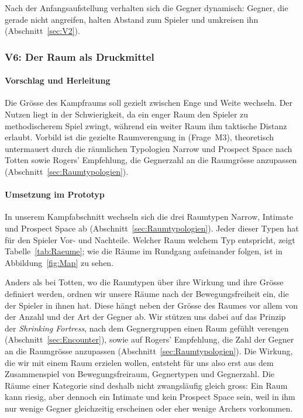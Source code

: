 \documentclass[../Main.tex]{subfiles}
\begin{document}
Nach der Anfangsaufstellung verhalten sich die Gegner dynamisch: Gegner, die gerade nicht angreifen, halten Abstand zum Spieler und umkreisen ihn (Abschnitt~\ref{sec:V2}).

\subsubsection{V6: Der Raum als Druckmittel} \label{sec:V6}

\paragraph{Vorschlag und Herleitung}
Die Grösse des Kampfraums soll gezielt zwischen Enge und Weite wechseln. Der Nutzen liegt in der Schwierigkeit, da ein enger Raum den Spieler zu methodischerem Spiel zwingt, während ein weiter Raum ihm taktische Distanz erlaubt. Vorbild ist die gezielte Raumverengung in  (Frage~M3), theoretisch untermauert durch die räumlichen Typologien Narrow und Prospect Space nach Totten sowie Rogers' Empfehlung, die Gegnerzahl an die Raumgrösse anzupassen (Abschnitt~\ref{sec:Raumtypologien}).

\paragraph{Umsetzung im Prototyp}
In unserem Kampfabschnitt wechseln sich die drei Raumtypen Narrow, Intimate und Prospect Space ab (Abschnitt~\ref{sec:Raumtypologien}). Jeder dieser Typen hat für den Spieler Vor- und Nachteile. Welcher Raum welchem Typ entspricht, zeigt Tabelle~\ref{tab:Raeume}; wie die Räume im Rundgang aufeinander folgen, ist in Abbildung~\ref{fig:Map} zu sehen.

Anders als bei Totten, wo die Raumtypen über ihre Wirkung und ihre Grösse definiert werden, ordnen wir unsere Räume nach der Bewegungsfreiheit ein, die der Spieler in ihnen hat. Diese hängt neben der Grösse des Raumes vor allem von der Anzahl und der Art der Gegner ab. Wir stützen uns dabei auf das Prinzip der \textit{Shrinking Fortress}, nach dem Gegnergruppen einen Raum gefühlt verengen (Abschnitt~\ref{sec:Encounter}), sowie auf Rogers' Empfehlung, die Zahl der Gegner an die Raumgrösse anzupassen (Abschnitt~\ref{sec:Raumtypologien}). Die Wirkung, die wir mit einem Raum erzielen wollen, entsteht für uns also erst aus dem Zusammenspiel von Bewegungsfreiraum, Gegnertypen und Gegnerzahl. Die Räume einer Kategorie sind deshalb nicht zwangsläufig gleich gross: Ein Raum kann riesig, aber dennoch ein Intimate und kein Prospect Space sein, weil in ihm nur wenige Gegner gleichzeitig erscheinen oder eher wenige Archers vorkommen.
\end{document}
